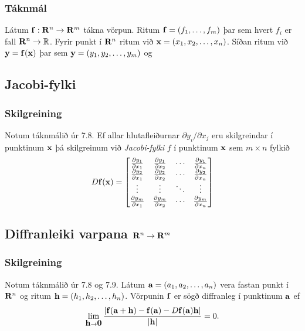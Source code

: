 \subsubsection{Táknmál }
Látum $\mbox{${\bf f}$}:\mbox{${\bf R}^n$}\rightarrow\mbox{${\bf R}^m$}$ tákna vörpun.
Ritum $\mbox{${\bf f}$}=(f_1,\ldots,f_m)$ þar sem hvert $f_i$ er fall
$\mbox{${\bf R}^n$}\rightarrow{\mathbb R}$.  Fyrir punkt í $\mbox{${\bf R}^n$}$ ritum við
$\mbox{${\bf x}$}=(x_1,x_2,\ldots,x_n)$.  Síðan ritum við $\mbox{${\bf y}$}=\mbox{${\bf f}$}(\mbox{${\bf x}$})$ þar sem 
$\mbox{${\bf y}$}=(y_1,y_2,\ldots,y_m)$ og 




\subsection{Jacobi-fylki} 
 \subsubsection{Skilgreining }
 Notum táknmálið úr 7.8.
Ef allar hlutafleiðurnar $\partial
y_i/\partial x_j$ eru skilgreindar í punktinum $\mbox{${\bf x}$}$ þá skilgreinum
við {\em Jacobi-fylki} $f$ í punktinum $\mbox{${\bf x}$}$ sem $m\times n$ fylkið
$$D\mbox{${\bf f}$}(\mbox{${\bf x}$})=\begin{bmatrix}
\frac{\partial y_1}{\partial x_1}&\frac{\partial y_1}{\partial x_2}&
\cdots&\frac{\partial y_1}{\partial x_n}\\
\frac{\partial y_2}{\partial x_1}&\frac{\partial y_2}{\partial x_2}&
\cdots&\frac{\partial y_2}{\partial x_n}\\
\vdots&\vdots&\ddots&\vdots\\
\frac{\partial y_m}{\partial x_1}&\frac{\partial y_m}{\partial x_2}&
\cdots&\frac{\partial y_m}{\partial x_n}
\end{bmatrix}$$



\subsection{Diffranleiki varpana $\mbox{${\bf R}^n$}\rightarrow\mbox{${\bf R}^m$}$} 
 \subsubsection{Skilgreining }
 Notum táknmálið úr 7.8 og 7.9. Látum $\mbox{${\bf a}$}=(a_1, a_2, \ldots, a_n)$ vera fastan punkt í $\mbox{${\bf R}^n$}$ og ritum 
$\mbox{${\bf h}$}=(h_1,h_2,\ldots,h_n)$.  Vörpunin $\mbox{${\bf f}$}$ er
sögð diffranleg í punktinum $\mbox{${\bf a}$}$ ef
$$\lim_{\mbox{${\bf h}$}\rightarrow
  \mbox{${\bf 0}$}}\frac{|\mbox{${\bf f}$}(\mbox{${\bf a}$}+\mbox{${\bf h}$})-\mbox{${\bf f}$}(\mbox{${\bf a}$})-D\mbox{${\bf f}$}(\mbox{${\bf a}$})\mbox{${\bf h}$}|}{|\mbox{${\bf h}$}|}=0.$$ 

